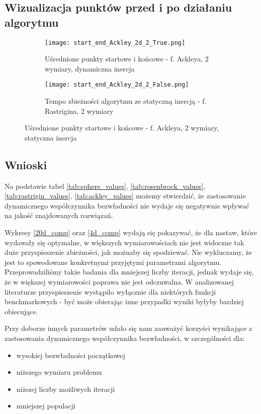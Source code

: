 \documentclass[12pt]{article}
\begin{document}
\pagebreak
\FloatBarrier


\subsection*{Wizualizacja punktów przed i po działaniu algorytmu}

\begin{figure}[h!]
	\centering
	\begin{subfigure}{0.49\textwidth}
		\texttt{[image: start\_end\_Ackley\_2d\_2\_True.png]}
		\caption{Uśrednione punkty startowe i końcowe - f. Ackleya, 2 wymiary, dynamiczna inercja}
	\end{subfigure}
	\hfill
	\begin{subfigure}{0.49\textwidth}
		\texttt{[image: start\_end\_Ackley\_2d\_2\_False.png]}
		\caption{Tempo zbieżności algorytmu ze statyczną inercją - f. Rastrigina, 2 wymiary}
	\end{subfigure}
	\caption{Uśrednione punkty startowe i końcowe - f. Ackleya, 2 wymiary, statyczna inercja}
	\label{ackley_start_end}
\end{figure}

\subsection*{Wnioski}
Na podstawie tabel \ref{tab:sphere_values}, \ref{tab:rosenbrock_values}, \ref{tab:rastrigin_values}, \ref{tab:ackley_values} możemy stwierdzić, że
zastosowanie dynamicznego współczynnika bezwładności nie wydaje się negatywnie wpływać na jakość znajdowanych rozwiązań.

Wykresy \ref{20d_comp} oraz \ref{4d_comp} wydają się pokazywać, że dla nastaw, które wydawały się optymalne, w większych wymiarowościach nie jest widoczne tak duże
przyspieszenie zbieżności, jak możnaby się spodziewać. Nie wykluczamy, że jest to spowodowane konkretnymi przyjętymi parametrami algorytmu. Przeprowadziliśmy
także badania dla mniejszej liczby iteracji, jednak wydaje się, że w większej wymiarowości poprawa nie jest odczuwalna. W analizowanej literaturze przyspieszenie
wystąpiło wyłącznie dla niektórych funkcji benchmarkowych - być może obierając inne przypadki wyniki byłyby bardziej obiecujące.

Przy doborze innych parametrów udało się nam zauważyć korzyści wynikające z zastosowania dynamicznego współczynnika bezwładności, w szczególności dla:
\begin{itemize}
	\item wysokiej bezwładności początkowej
	\item niższego wymiaru problemu
	\item niższej liczby możliwych iteracji
	\item mniejszej populacji
\end{itemize}
\end{document}
